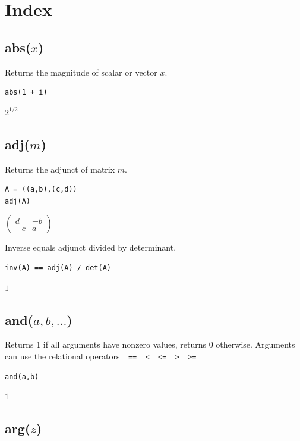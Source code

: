 
\newpage

\section{Index}

\subsection*{abs($x$)}

Returns the magnitude of scalar or vector $x$.

{\color{blue}
\begin{verbatim}
abs(1 + i)
\end{verbatim}
}

$2^{1/2}$

\subsection*{adj($m$)}

Returns the adjunct of matrix $m$.

{\color{blue}
\begin{verbatim}
A = ((a,b),(c,d))
adj(A)
\end{verbatim}
}

$
\begin{pmatrix}
d&-b
\\[1ex]
-c&a
\end{pmatrix}
$

\bigskip
Inverse equals adjunct divided by determinant.

{\color{blue}
\begin{verbatim}
inv(A) == adj(A) / det(A)
\end{verbatim}
}

$1$

\subsection*{and($a,b,\ldots$)}

Returns 1 if all arguments have nonzero values, returns 0 otherwise.
Arguments can use the relational operators\verb$  ==  <  <=  >  >=$

{\color{blue}
\begin{verbatim}
and(a,b)
\end{verbatim}
}

$1$

\subsection*{arg($z$)}

